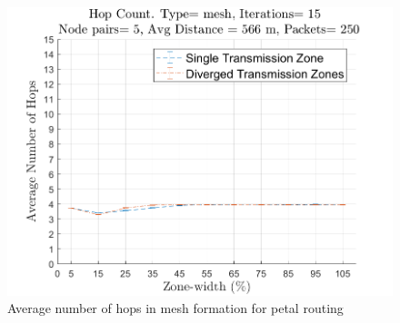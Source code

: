 \begin{figure}[hbtp]
\centering
\includegraphics[width=\simResultFigSize \textwidth]{ncsuthesis-0.6/Chapter-5/figs/pe_hops_mesh.png}
\caption{Average number of hops in mesh formation for petal routing}
\label{fig:pe_hops_mesh}
\end{figure}

